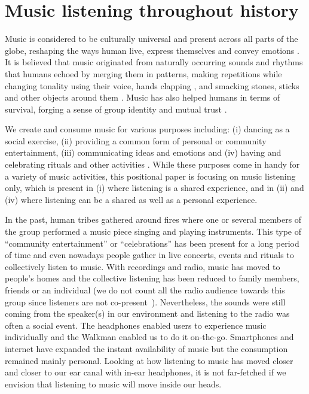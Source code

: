 \documentclass[sigchi]{acmart}
\begin{document}
\section{Music listening throughout history}

Music is considered to be culturally universal \cite{campbell1997music, seeger1971reflections} and present across all parts of the globe, reshaping the ways human live, express themselves and convey emotions \cite{juslin2001music,montagu2017music}. It is believed that music originated from naturally occurring sounds and rhythms that humans echoed by merging them in patterns, making repetitions while changing tonality using their voice\cite{montagu2017music, morley2013prehistory}, hands clapping \cite{kassler1987dancing}, and smacking stones, sticks and other objects around them \cite{montagu2014horns}. Music has also helped humans in terms of survival, forging a sense of group identity and mutual trust \cite{conard2009new}. 

We create and consume music for various purposes including: (i) dancing as a social exercise, (ii) providing a common form of personal or community entertainment, (iii) communicating ideas and emotions and (iv) having and celebrating rituals and other activities \cite{montagu2017music}. While these purposes come in handy for a variety of music activities, this positional paper is focusing on music listening only, which is present in (i) where listening is a shared experience, and in (ii) and (iv) where listening can be a shared as well as a personal experience. 

In the past, human tribes gathered around fires where one or several members of the group performed a music piece singing and playing instruments. This type of ``community entertainment'' or ``celebrations'' has been present for a long period of time and even nowadays people gather in live concerts, events and rituals to collectively listen to music. With recordings and radio, music has moved to people's homes and the collective listening has been reduced to family members, friends or an individual (we do not count all the radio audience towards this group since listeners are not co-present~\cite{bonini2014new}). Nevertheless, the sounds were still coming from the speaker(s) in our environment and listening to the radio was often a social event. The headphones enabled users to experience music individually and the Walkman enabled us to do it on-the-go. Smartphones and internet have expanded the instant availability of music but the consumption remained mainly personal. Looking at how listening to music has moved closer and closer to our ear canal with in-ear headphones, it is not far-fetched if we envision that listening to music will move inside our heads.
\end{document}
